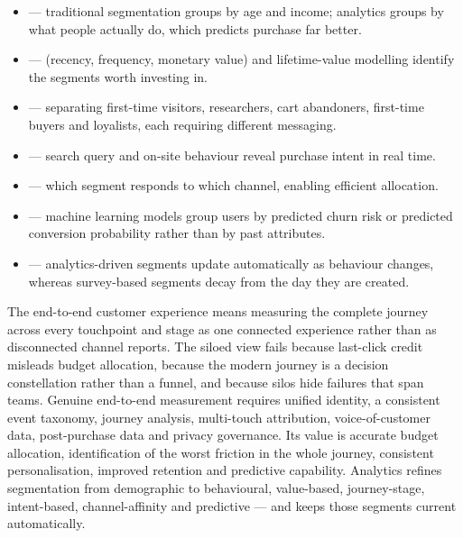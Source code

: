 \begin{itemize}
\item {} --- traditional
      segmentation groups by age and income; analytics groups by what people
      actually do, which predicts purchase far better.
\item {} --- 
      (recency, frequency, monetary value) and lifetime-value modelling identify
      the segments worth investing in.
\item {} --- separating first-time visitors,
      researchers, cart abandoners, first-time buyers and loyalists, each
      requiring different messaging.
\item {} --- search query and on-site behaviour
      reveal purchase intent in real time.
\item {} --- which segment responds to which
      channel, enabling efficient allocation.
\item {} --- machine learning models group users by
      predicted churn risk or predicted conversion probability rather than by past
      attributes.
\item {} --- analytics-driven segments update
      automatically as behaviour changes, whereas survey-based segments decay from
      the day they are created.
\end{itemize}

\begin{summarybox}
The end-to-end customer experience means measuring the complete journey across
every touchpoint and stage as one connected experience rather than as disconnected
channel reports. The siloed view fails because last-click credit misleads budget
allocation, because the modern journey is a decision constellation rather than a
funnel, and because silos hide failures that span teams. Genuine end-to-end
measurement requires unified identity, a consistent event taxonomy, journey
analysis, multi-touch attribution, voice-of-customer data, post-purchase data and
privacy governance. Its value is accurate budget allocation, identification of the
worst friction in the whole journey, consistent personalisation, improved
retention and predictive capability. Analytics refines segmentation from
demographic to behavioural, value-based, journey-stage, intent-based,
channel-affinity and predictive --- and keeps those segments current
automatically.
\end{summarybox}

